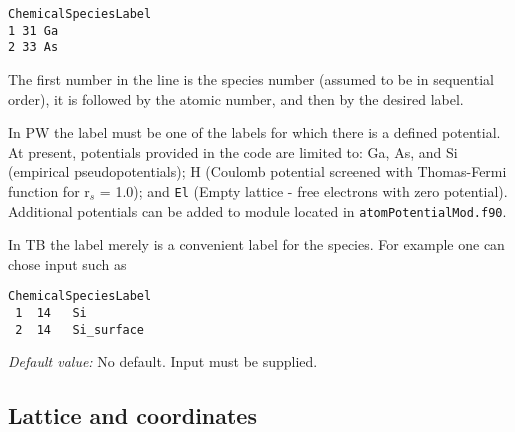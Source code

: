 \begin{description}
\begin{verbatim}
ChemicalSpeciesLabel
1 31 Ga
2 33 As
\end{verbatim}
The first number in the line is the species number (assumed to be
in sequential order), it is followed by the atomic number, and
then by the desired label.

In PW the label must be one of the labels for which there is a
defined potential.  At present, potentials provided in the code
are limited to: Ga, As, and Si (empirical pseudopotentials); H
(Coulomb potential screened with Thomas-Fermi function for r$_s$ =
1.0); and {\tt El} (Empty lattice - free electrons with zero
potential). Additional potentials can be added to module located
in {\tt atomPotentialMod.f90}.

In TB the label merely is a convenient label for the species. For
example one can chose input such as

\begin{verbatim}
ChemicalSpeciesLabel
 1  14   Si
 2  14   Si_surface
\end{verbatim}

{\it Default value:} No default.  Input must be supplied.

\end{description}


\subsection{Lattice and coordinates}

